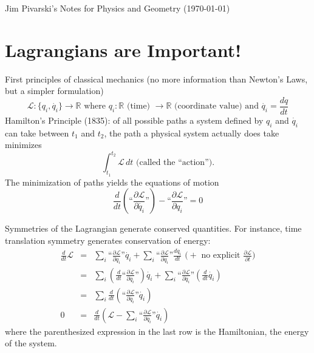 \documentclass[12pt]{article}
\begin{document}
\begin{flushright}
Jim Pivarski's Notes for Physics and Geometry (\today)
\end{flushright}

\section{Lagrangians are Important!}

First principles of classical mechanics (no more information than
Newton's Laws, but a simpler formulation)
\begin{equation}
  \mathcal{L} : \{q_i, \dot{q_i}\} \to \mathbb{R} \mbox{ where }
  q_i : \mathbb{R} \mbox{ (time) } \to \mathbb{R} \mbox{ (coordinate value) and }
  \dot{q_i} = \frac{dq}{dt}
\end{equation}
Hamilton's Principle (1835): of all possible paths a system defined by
$q_i$ and $\dot{q_i}$ can take between $t_1$ and $t_2$, the path a
physical system actually does take minimizes
\begin{equation}
  \int_{t_1}^{t_2} \mathcal{L} \, dt \mbox{ (called the ``action'').}
\end{equation}
The minimization of paths yields the equations of motion
\begin{equation}
  \frac{d}{dt}\left(\mbox{``}\frac{\partial \mathcal{L}}{\partial \dot{q_i}}\mbox{''}
  \right) - \mbox{``}\frac{\partial \mathcal{L}}{\partial q_i}\mbox{''} = 0
\end{equation}

Symmetries of the Lagrangian generate conserved quantities.  For
instance, time translation symmetry generates conservation of energy:
\begin{eqnarray}
  \frac{d}{dt}\mathcal{L} &=& \sum_i \mbox{``} \frac{\partial \mathcal{L}}{\partial q_i} \mbox{''} \dot{q_i} +
  \sum_i \mbox{``} \frac{\partial \mathcal{L}}{\partial \dot{q_i}} \mbox{''} \frac{d\dot{q_i}}{dt} 
  \mbox{ ($+$ no explicit $\displaystyle \frac{\partial\mathcal{L}}{\partial t}$)} \\
  &=& \sum_i \left( \frac{d}{dt} \mbox{``} \frac{\partial \mathcal{L}}{\partial \dot{q_i}} \mbox{''} \right) \dot{q_i} +
  \sum_i \mbox{``} \frac{\partial \mathcal{L}}{\partial \dot{q_i}} \mbox{''} \left(\frac{d}{dt}\dot{q_i}\right) \\
  &=& \sum_i \frac{d}{dt} \left( \mbox{``} \frac{\partial \mathcal{L}}{\partial \dot{q_i}} \mbox{''} \dot{q_i} \right) \\
  0 &=& \frac{d}{dt} \left(\mathcal{L} - \sum_i\mbox{``} \frac{\partial \mathcal{L}}{\partial \dot{q_i}} \mbox{''} \dot{q_i} \right)
\end{eqnarray}
where the parenthesized expression in the last row is the Hamiltonian,
the energy of the system.
\end{document}
